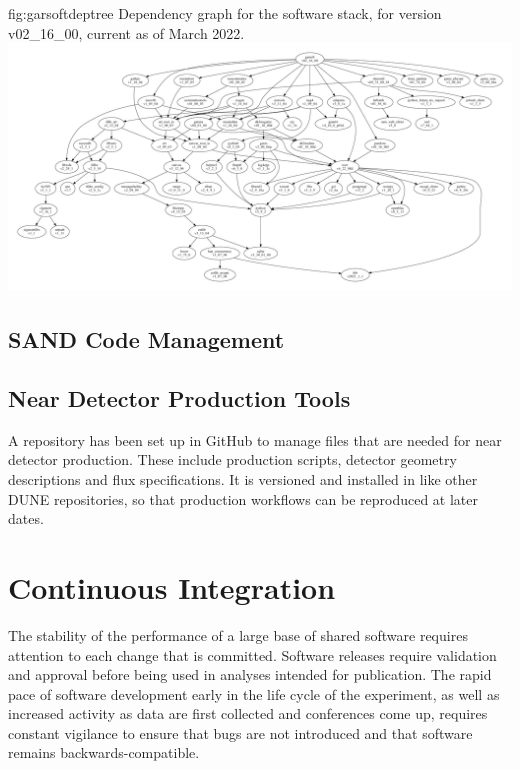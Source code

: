 \documentclass[../main-v1.tex]{subfiles}
\begin{document}
\begin{dunefigure}
{fig:garsoftdeptree}
{Dependency graph for the  software stack, for version v02\_16\_00, current as of March 2022.}
\includegraphics[width=\textwidth]{graphics/CodeManagementFigures/garsoft_v02_16_00_graph.pdf}
\end{dunefigure}

\subsection{SAND Code Management}
\label{sec:codemgmt:sand}

\subsection{Near Detector Production Tools}
\label{sec:codemgmt:ndproduction}

A repository has been set up in GitHub to manage files that are needed for near detector production.  These include production scripts, detector geometry descriptions and flux specifications.  It is versioned and installed in  like other DUNE repositories, so that production workflows can be reproduced at later dates.

\section{Continuous Integration }
\label{sec:codemgmt:ci}

The stability of the performance of a large base of shared software requires attention to each change that is committed.  Software releases require validation and approval before being used in analyses intended for publication.  The rapid pace of software development early in the life cycle of the experiment, as well as increased activity as data are first collected and conferences come up, requires constant vigilance to ensure that bugs are not introduced and that software remains backwards-compatible.
\end{document}
